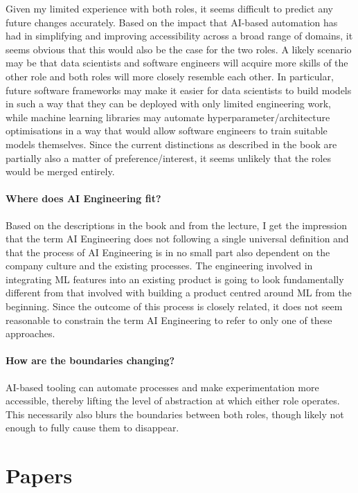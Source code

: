 \documentclass{article}
\begin{document}
Given my limited experience with both roles, it seems difficult to predict any future changes accurately. Based on the impact that AI-based automation has had in simplifying and improving accessibility across a broad range of domains, it seems obvious that this would also be the case for the two roles. A likely scenario may be that data scientists and software engineers will acquire more skills of the other role and both roles will more closely resemble each other. In particular, future software frameworks may make it easier for data scientists to build models in such a way that they can be deployed with only limited engineering work, while machine learning libraries may automate hyperparameter/architecture optimisations in a way that would allow software engineers to train suitable models themselves. Since the current distinctions as described in the book are partially also a matter of preference/interest, it seems unlikely that the roles would be merged entirely.

\paragraph{Where does AI Engineering fit?}

Based on the descriptions in the book and from the lecture, I get the impression that the term AI Engineering does not following a single universal definition and that the process of AI Engineering is in no small part also dependent on the company culture and the existing processes. The engineering involved in integrating ML features into an existing product is going to look fundamentally different from that involved with building a product centred around ML from the beginning. Since the outcome of this process is closely related, it does not seem reasonable to constrain the term AI Engineering to refer to only one of these approaches.

\paragraph{How are the boundaries changing?}

AI-based tooling can automate processes and make experimentation more accessible, thereby lifting the level of abstraction at which either role operates. This necessarily also blurs the boundaries between both roles, though likely not enough to fully cause them to disappear.

\section{Papers}
\end{document}

